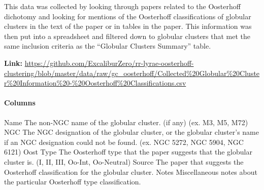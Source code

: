\documentclass[]{article}
\begin{document}
\vspace{12pt}

This data was collected by looking through papers related to the Oosterhoff dichotomy and looking for mentions of the Oosterhoff classifications of globular clusters in the text of the paper or in tables in the paper. This information was then put into a spreadsheet and filtered down to globular clusters that met the same inclusion criteria as the ``Globular Clusters Summary'' table.

\vspace{12pt}

\textbf{Link:} \url{https://github.com/ExcaliburZero/rr-lyrae-oosterhoff-clustering/blob/master/data/raw/gc_oosterhoff/Collected\%20Globular\%20Cluster\%20Information\%20-\%20Oosterhoff\%20Classifications.csv}

\paragraph{Columns}

\begin{outline}
	\1 Name
	\2 The non-NGC name of the globular cluster. (if any) (ex. M3, M5, M72)
	\1 NGC
	\2 The NGC designation of the globular cluster, or the globular cluster’s name if an NGC designation could not be found. (ex. NGC 5272, NGC 5904, NGC 6121)
	\1 Oost Type
	\2 The Oosterhoff type that the paper suggests that the globular cluster is. (I, II, III, Oo-Int, Oo-Neutral)
	\1 Source
	\2 The paper that suggests the Oosterhoff classification for the globular cluster.
	\1 Notes
	\2 Miscellaneous notes about the particular Oosterhoff type classification.
\end{outline}

\newpage
\end{document}
